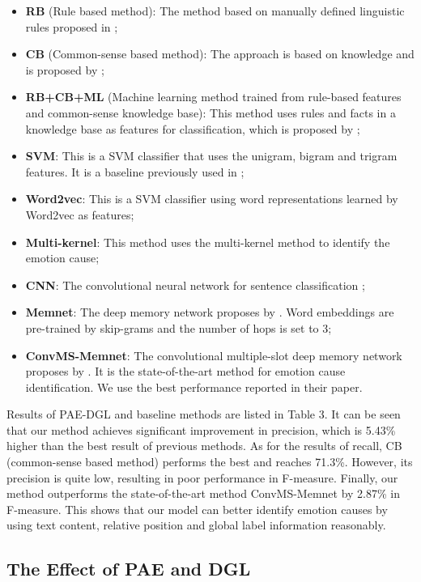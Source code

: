 \documentclass[letterpaper]{article} \usepackage{aaai19}  \usepackage{times}  \usepackage{helvet}  \usepackage{courier}  \usepackage{url}  \usepackage{graphicx}  \frenchspacing  \setlength{\pdfpagewidth}{8.5in}  \setlength{\pdfpageheight}{11in}  \setcounter{secnumdepth}{0}
\begin{document}
\begin{itemize}
	\item \textbf{RB} (Rule based method): The method based on manually defined linguistic rules proposed in \cite{lee2010text};
	\item \textbf{CB} (Common-sense based method): The approach is based on knowledge and is proposed by \cite{russo2011emocause};
	\item \textbf{RB+CB+ML} (Machine learning method trained from rule-based features and common-sense knowledge base): This method uses rules and facts in a knowledge base as features for classification, which is proposed by \cite{chen2010emotion};
	\item \textbf{SVM}: This is a SVM classifier that uses the unigram, bigram and trigram features. It is a baseline previously used in \cite{gui2017question};
	\item \textbf{Word2vec}: This is a SVM classifier using word representations learned by Word2vec as features;
	\item \textbf{Multi-kernel}: This method uses the multi-kernel method \cite{gui2016event} to identify the emotion cause;
	\item \textbf{CNN}: The convolutional neural network for sentence classification \cite{kim2014convolutional};
	\item \textbf{Memnet}: The deep memory network proposes by \cite{gui2017question}. Word embeddings are pre-trained by skip-grams and the number of hops is set to 3;
	\item \textbf{ConvMS-Memnet}: The convolutional multiple-slot deep memory network proposes by \cite{gui2017question}. It is the state-of-the-art method for emotion cause identification. We use the best performance reported in their paper.
\end{itemize}

Results of PAE-DGL and baseline methods are listed in Table 3. It can be seen that our method achieves significant improvement in precision, which is 5.43\% higher than the best result of previous methods. As for the results of recall, CB (common-sense based method) performs the best and reaches 71.3\%. However, its precision is quite low, resulting in poor performance in F-measure. Finally, our method outperforms the state-of-the-art method ConvMS-Memnet by 2.87\% in F-measure. This shows that our model can better identify emotion causes by using text content, relative position and global label information reasonably.


\subsection{The Effect of PAE and DGL}
\end{document}
